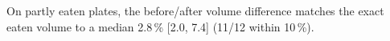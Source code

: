 On partly eaten plates, the before/after volume difference matches the exact eaten volume to a median 2.8\,\% [2.0, 7.4] (11/12 within 10\,\%).
